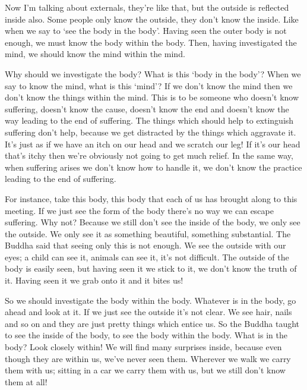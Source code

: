 Now I'm talking about externals, they're like that, but the outside is reflected inside also. Some people only know the outside, they don't know the inside. Like when we say to `see the body in the body'. Having seen the outer body is not enough, we must know the body within the body. Then, having investigated the mind, we should know the mind within the mind. 

Why should we investigate the body? What is this `body in the body'? When we say to know the mind, what is this `mind'? If we don't know the mind then we don't know the things within the mind. This is to be someone who doesn't know suffering, doesn't know the cause, doesn't know the end and doesn't know the way leading to the end of suffering. The things which should help to extinguish suffering don't help, because we get distracted by the things which aggravate it. It's just as if we have an itch on our head and we scratch our leg! If it's our head that's itchy then we're obviously not going to get much relief. In the same way, when suffering arises we don't know how to handle it, we don't know the practice leading to the end of suffering. 

For instance, take this body, this body that each of us has brought along to this meeting. If we just see the form of the body there's no way we can escape suffering. Why not? Because we still don't see the inside of the body, we only see the outside. We only see it as something beautiful, something substantial. The Buddha said that seeing only this is not enough. We see the outside with our eyes; a child can see it, animals can see it, it's not difficult. The outside of the body is easily seen, but having seen it we stick to it, we don't know the truth of it. Having seen it we grab onto it and it bites us! 

So we should investigate the body within the body. Whatever is in the body, go ahead and look at it. If we just see the outside it's not clear. We see hair, nails and so on and they are just pretty things which entice us. So the Buddha taught to see the inside of the body, to see the body within the body. What is in the body? Look closely within! We will find many surprises inside, because even though they are within us, we've never seen them. Wherever we walk we carry them with us; sitting in a car we carry them with us, but we still don't know them at all! 

